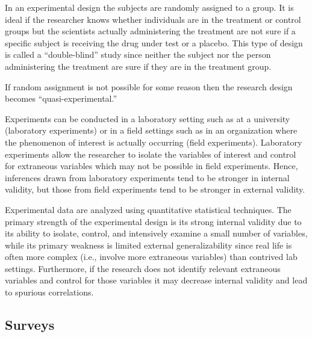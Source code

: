 In an experimental design the subjects are randomly assigned to a group. It is ideal if the researcher knows whether individuals are in the treatment or control groups but the scientists actually administering the treatment are not sure if a specific subject is receiving the drug under test or a placebo. This type of design is called a ``double-blind'' study since neither the subject nor the person administering the treatment are sure if they are in the treatment group.

If random assignment is not possible for some reason then the research design becomes ``quasi-experimental.''

Experiments can be conducted in a laboratory setting such as at a university (laboratory experiments) or in a field settings such as in an organization where the phenomenon of interest is actually occurring (field experiments). Laboratory experiments allow the researcher to isolate the variables of interest and control for extraneous variables which may not be possible in field experiments. Hence, inferences drawn from laboratory experiments tend to be stronger in internal validity, but those from field experiments tend to be stronger in external validity. 

Experimental data are analyzed using quantitative statistical techniques. The primary strength of the experimental design is its strong internal validity due to its ability to isolate, control, and intensively examine a small number of variables, while its primary weakness is limited external generalizability since real life is often more complex (i.e., involve more extraneous variables) than contrived lab settings. Furthermore, if the research does not identify relevant extraneous variables and control for those variables it may decrease internal validity and lead to spurious correlations.

\subsection{Surveys}

